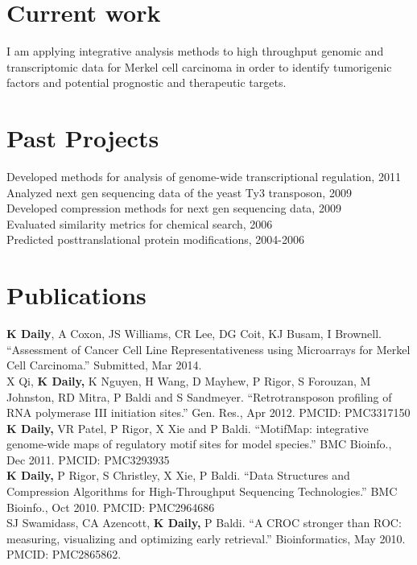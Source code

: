 \documentclass[margin,line]{res}
\begin{document}
\begin{resume}
\section{Current work}
I am applying integrative analysis methods to high throughput genomic and transcriptomic data for Merkel cell carcinoma in order to identify tumorigenic factors and potential prognostic and therapeutic targets.

\section{Past Projects}
Developed methods for analysis of genome-wide transcriptional regulation, 2011 \\
Analyzed next gen sequencing data of the yeast Ty3 transposon, 2009\\
Developed compression methods for next gen sequencing data, 2009 \\
Evaluated similarity metrics for chemical search, 2006\\
Predicted posttranslational protein modifications, 2004-2006

\section{Publications}
\textbf{K Daily}, A Coxon, JS Williams, CR Lee, DG Coit, KJ Busam, I Brownell. ``Assessment of Cancer Cell Line Representativeness using Microarrays for Merkel Cell Carcinoma.'' Submitted, Mar 2014. \\
X Qi, \textbf{K Daily,} K Nguyen, H Wang, D Mayhew, P Rigor, S Forouzan, M Johnston, RD Mitra, P Baldi and S Sandmeyer. ``Retrotransposon profiling of RNA polymerase III initiation sites.'' Gen. Res., Apr 2012. PMCID: PMC3317150 \\
\textbf{K Daily,} VR Patel, P Rigor, X Xie and P Baldi. ``MotifMap: integrative genome-wide maps of regulatory motif sites for model species.'' BMC Bioinfo., Dec 2011. PMCID: PMC3293935\\
\textbf{K Daily,} P Rigor, S Christley, X Xie, P Baldi. ``Data Structures and Compression Algorithms for High-Throughput Sequencing Technologies.'' BMC Bioinfo., Oct 2010. PMCID: PMC2964686\\
SJ Swamidass, CA Azencott, \textbf{K Daily,} P Baldi. ``A CROC stronger than ROC: measuring, visualizing and optimizing early retrieval.'' Bioinformatics, May 2010. PMCID: PMC2865862.\\


\end{resume}
\end{document}
